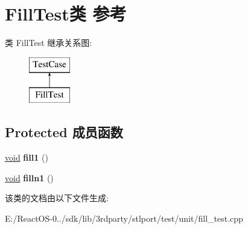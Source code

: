 \hypertarget{class_fill_test}{}\section{Fill\+Test类 参考}
\label{class_fill_test}
类 Fill\+Test 继承关系图\+:\begin{figure}[H]
\begin{center}
\leavevmode
\includegraphics[height=2.000000cm]{class_fill_test}
\end{center}
\end{figure}
\subsection*{Protected 成员函数}
\begin{DoxyCompactItemize}
\item 
\mbox{\label{class_fill_test_a16eb96cc013e7643c641cc3db7a2aa38}} 
\hyperlink{interfacevoid}{void} {\bfseries fill1} ()
\item 
\mbox{\label{class_fill_test_a027bc4d23c3f0dcbb651aa8d8b9814d4}} 
\hyperlink{interfacevoid}{void} {\bfseries filln1} ()
\end{DoxyCompactItemize}


该类的文档由以下文件生成\+:\begin{DoxyCompactItemize}
\item 
E\+:/\+React\+O\+S-\/0../sdk/lib/3rdparty/stlport/test/unit/fill\+\_\+test.\+cpp\end{DoxyCompactItemize}
